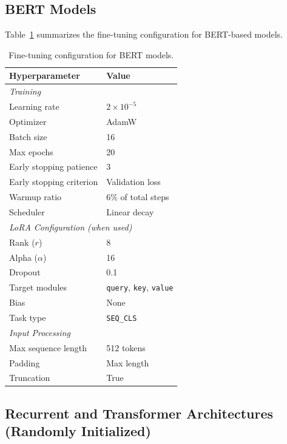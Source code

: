 \documentclass{article}
\theoremstyle{plain}
\theoremstyle{definition}
\theoremstyle{remark}
\begin{document}
\subsection{BERT Models}
\label{appendix:bert}

Table~\ref{tab:bert_config} summarizes the fine-tuning configuration for BERT-based models.

\begin{table}[h]
\centering
\caption{Fine-tuning configuration for BERT models.}
\label{tab:bert_config}
\begin{tabular}{ll}
\toprule
Hyperparameter & Value \\
\midrule
\multicolumn{2}{l}{\textit{Training}} \\
Learning rate & $2 \times 10^{-5}$ \\
Optimizer & AdamW \\
Batch size & 16 \\
Max epochs & 20 \\
Early stopping patience & 3 \\
Early stopping criterion & Validation loss \\
Warmup ratio & 6\% of total steps \\
Scheduler & Linear decay \\
\midrule
\multicolumn{2}{l}{\textit{LoRA Configuration (when used)}} \\
Rank ($r$) & 8 \\
Alpha ($\alpha$) & 16 \\
Dropout & 0.1 \\
Target modules & \texttt{query}, \texttt{key}, \texttt{value} \\
Bias & None \\
Task type & \texttt{SEQ\_CLS} \\
\midrule
\multicolumn{2}{l}{\textit{Input Processing}} \\
Max sequence length & 512 tokens \\
Padding & Max length \\
Truncation & True \\
\bottomrule
\end{tabular}
\end{table}


\subsection{Recurrent and Transformer Architectures (Randomly Initialized)}
\label{appendix:dl_scratch}
\end{document}
